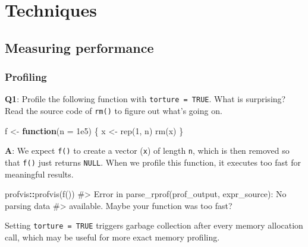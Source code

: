 \documentclass[
]{krantz}
\makeatletter
\newenvironment{Shaded}{\begin{snugshade}}{\end{snugshade}}
\newcommand{\CommentTok}[1]{\textcolor[rgb]{0.56,0.35,0.01}{\textit{#1}}}
\newcommand{\ControlFlowTok}[1]{\textcolor[rgb]{0.13,0.29,0.53}{\textbf{#1}}}
\newcommand{\DataTypeTok}[1]{\textcolor[rgb]{0.13,0.29,0.53}{#1}}
\newcommand{\DecValTok}[1]{\textcolor[rgb]{0.00,0.00,0.81}{#1}}
\newcommand{\FloatTok}[1]{\textcolor[rgb]{0.00,0.00,0.81}{#1}}
\newcommand{\KeywordTok}[1]{\textcolor[rgb]{0.13,0.29,0.53}{\textbf{#1}}}
\newcommand{\NormalTok}[1]{#1}
\newcommand{\OperatorTok}[1]{\textcolor[rgb]{0.81,0.36,0.00}{\textbf{#1}}}
\newcommand{\StringTok}[1]{\textcolor[rgb]{0.31,0.60,0.02}{#1}}
\newenvironment{kframe}{%
\medskip{}
\setlength{\fboxsep}{.8em}
 \def\at@end@of@kframe{}%
 \ifinner\ifhmode%
  \def\at@end@of@kframe{\end{minipage}}%
  \begin{minipage}{\columnwidth}%
 \fi\fi%
 \def\FrameCommand##1{\hskip\@totalleftmargin \hskip-\fboxsep
 \colorbox{shadecolor}{##1}\hskip-\fboxsep
     \hskip-\linewidth \hskip-\@totalleftmargin \hskip\columnwidth}%
 \MakeFramed {\advance\hsize-\width
   \@totalleftmargin\z@ \linewidth\hsize
   \@setminipage}}%
 {\par\unskip\endMakeFramed%
 \at@end@of@kframe}
\renewenvironment{Shaded}{\begin{kframe}}{\end{kframe}}
\renewcommand{\KeywordTok} [1]{\textcolor[rgb]{0.00,0.44,0.13}{{#1}}}
\renewcommand{\DataTypeTok}[1]{\textcolor[rgb]{0.56,0.13,0.00}{{#1}}}
\renewcommand{\DecValTok}  [1]{\textcolor[rgb]{0.25,0.63,0.44}{{#1}}}
\renewcommand{\FloatTok}   [1]{\textcolor[rgb]{0.25,0.63,0.44}{{#1}}}
\renewcommand{\StringTok}  [1]{\textcolor[rgb]{0.25,0.44,0.63}{{#1}}}
\renewcommand{\CommentTok} [1]{\textcolor[rgb]{0.38,0.63,0.69}{{#1}}}
\renewcommand{\NormalTok}  [1]{{#1}}
\makeatother
\begin{document}
\hypertarget{part-techniques}{%
\part{Techniques}\label{part-techniques}}


\hypertarget{measuring-performance}{%
\chapter{Measuring performance}\label{measuring-performance}}


\hypertarget{profiling}{%
\section{Profiling}\label{profiling}}

\textbf{{Q1}}: Profile the following function with \texttt{torture\ =\ TRUE}. What is surprising? Read the source code of \texttt{rm()} to figure out what's going on.

\begin{Shaded}
\begin{Highlighting}[]
\NormalTok{f <-}\StringTok{ }\ControlFlowTok{function}\NormalTok{(}\DataTypeTok{n =} \FloatTok{1e5}\NormalTok{) \{}
\NormalTok{  x <-}\StringTok{ }\KeywordTok{rep}\NormalTok{(}\DecValTok{1}\NormalTok{, n)}
  \KeywordTok{rm}\NormalTok{(x)}
\NormalTok{\}}
\end{Highlighting}
\end{Shaded}

\textbf{{A}}: We expect \texttt{f()} to create a vector (\texttt{x}) of length \texttt{n}, which is then removed so that \texttt{f()} just returns \texttt{NULL}. When we profile this function, it executes too fast for meaningful results.

\begin{Shaded}
\begin{Highlighting}[]
\NormalTok{profvis}\OperatorTok{::}\KeywordTok{profvis}\NormalTok{(}\KeywordTok{f}\NormalTok{())}
\CommentTok{#> Error in parse_rprof(prof_output, expr_source): No parsing data}
\CommentTok{#> available. Maybe your function was too fast?}
\end{Highlighting}
\end{Shaded}

Setting \texttt{torture\ =\ TRUE} triggers garbage collection after every memory allocation call, which may be useful for more exact memory profiling.
\end{document}
